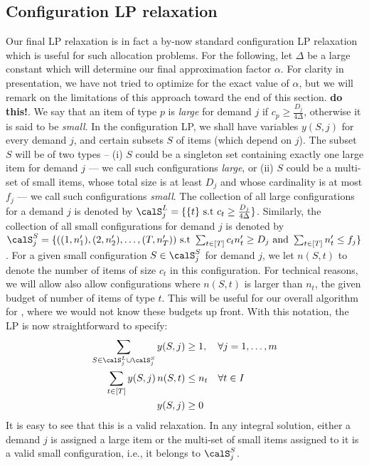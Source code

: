 \subsection{Configuration LP relaxation}
Our final LP relaxation is in fact a by-now standard configuration LP relaxation which is useful for such allocation problems. For the following, let $\Delta$ be a large constant which will determine our final approximation factor $\alpha$. For clarity in presentation, we have not tried to optimize for the exact value of $\alpha$, but we will remark on the limitations of this approach toward the end of this section. {\bf do this!}. We say that an item of type $p$ is {\em large} for demand $j$ if $c_p \geq \frac{D_j}{4\Delta}$, otherwise it is said to be \emph{small}. In the configuration LP, we shall have variables $y(S,j)$ for every demand $j$, and certain subsets $S$ of items (which depend on $j$). 
The subset $S$ will be of two types -- (i) $S$ could be a singleton set containing exactly one large item for demand $j$ --- we call such configurations {\em large}, or (ii) $S$ could be a multi-set of small items, whose total size is at least $D_j$ and whose cardinality is at most $f_j$ --- we call such configurations {\em small}. The collection of all large configurations for a demand $j$ is denoted by $\calS^L_j = \{ \{t\} \text{ s.t } c_t \geq \frac{D_j}{4 \Delta}  \}$. Similarly, the collection of all small configurations for demand $j$ is denoted by $\calS^S_j = \{ ((1,n'_1), (2,n'_2), \ldots, (T,n'_T)) \text{ s.t } \sum_{t \in [T]} c_t n'_t \geq D_j \text{ and } \sum_{t \in [T]} n'_t \leq f_j \}$. For a given small configuration $S \in \calS^S_j$ for demand $j$, we let $n(S,t)$ to denote the number of items of size $c_t$ in this configuration. For technical reasons, we will allow also allow configurations where $n(S,t)$ is larger than $n_t$, the given budget of number of items of type $t$. This will be useful for our overall algorithm for \mckc, where we would not know these budgets up front. With this notation, the LP is now straightforward to specify:
\begin{align}
\label{eq:config1}
\sum_{S \in \calS^L_j \cup \calS^S_j} y(S,j) & \geq 1, \ \ \ \forall j=1, \ldots, m \\
\label{eq:config2}
\sum_{t \in [T]} y(S,j) \, n(S,t) & \leq n_t \ \ \ \forall t  \in I \\
\notag
y({S,j}) & \geq 0
\end{align}
It is easy to see that this is a valid relaxation. In any integral solution, either a demand $j$ is assigned a large item or the multi-set of small items assigned to it is a valid small configuration, i.e., it belongs to $\calS^S_j$.


